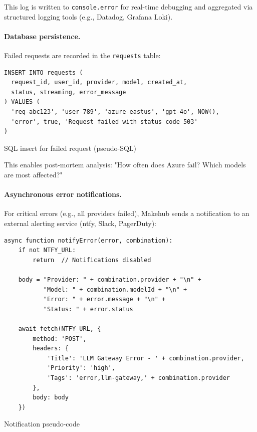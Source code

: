 \documentclass[english]{article}
\begin{document}
This log is written to \texttt{console.error} for real-time debugging and aggregated via structured logging tools (e.g., Datadog, Grafana Loki).

\paragraph{Database persistence.}

Failed requests are recorded in the \texttt{requests} table:

\begin{listing}[H]
\begin{verbatim}
INSERT INTO requests (
  request_id, user_id, provider, model, created_at,
  status, streaming, error_message
) VALUES (
  'req-abc123', 'user-789', 'azure-eastus', 'gpt-4o', NOW(),
  'error', true, 'Request failed with status code 503'
)
\end{verbatim}
\caption{SQL insert for failed request (pseudo-SQL)}
\end{listing}

This enables post-mortem analysis: "How often does Azure fail? Which models are most affected?"

\paragraph{Asynchronous error notifications.}

For critical errors (e.g., all providers failed), Makehub sends a notification to an external alerting service (ntfy, Slack, PagerDuty):

\begin{listing}[H]
\begin{verbatim}
async function notifyError(error, combination):
    if not NTFY_URL:
        return  // Notifications disabled

    body = "Provider: " + combination.provider + "\n" +
           "Model: " + combination.modelId + "\n" +
           "Error: " + error.message + "\n" +
           "Status: " + error.status

    await fetch(NTFY_URL, {
        method: 'POST',
        headers: {
            'Title': 'LLM Gateway Error - ' + combination.provider,
            'Priority': 'high',
            'Tags': 'error,llm-gateway,' + combination.provider
        },
        body: body
    })
\end{verbatim}
\caption{Notification pseudo-code}
\end{listing}
\end{document}
